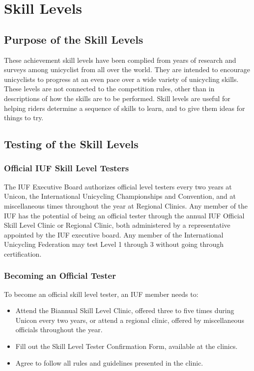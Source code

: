 \chapter*{Skill Levels \label{chap:skill}}

\section{Purpose of the Skill Levels}
These achievement skill levels have been complied from years of research and surveys among unicyclist from all over the world.
They are intended to encourage unicyclists to progress at an even pace over a wide variety of unicycling skills.
These levels are not connected to the competition rules, other than in descriptions of how the skills are to be performed.
Skill levels are useful for helping riders determine a sequence of skills to learn, and to give them ideas for things to try.

\section{Testing of the Skill Levels}

\subsection{Official IUF Skill Level Testers}
The IUF Executive Board authorizes official level testers every two years at Unicon, the International Unicycling Championships and Convention, and at miscellaneous times throughout the year at Regional Clinics.
Any member of the IUF has the potential of being an official tester through the annual IUF Official Skill Level Clinic or Regional Clinic, both administered by a representative appointed by the IUF executive board.
Any member of the International Unicycling Federation may test Level 1 through 3 without going through certification.

\subsection{Becoming an Official Tester}
To become an official skill level tester, an IUF member needs to:
\begin{itemize}
\item Attend the Biannual Skill Level Clinic, offered three to five times during Unicon every two years, or attend a regional clinic, offered by miscellaneous officials throughout the year.
\item Fill out the Skill Level Tester Confirmation Form, available at the clinics.
\item Agree to follow all rules and guidelines presented in the clinic.
\end{itemize}


